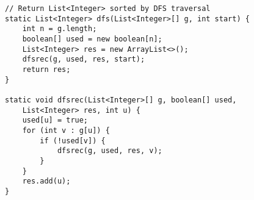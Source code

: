\begin{verbatim}
// Return List<Integer> sorted by DFS traversal
static List<Integer> dfs(List<Integer>[] g, int start) {
	int n = g.length;
	boolean[] used = new boolean[n];
	List<Integer> res = new ArrayList<>();	
	dfsrec(g, used, res, start);
	return res;
}

static void dfsrec(List<Integer>[] g, boolean[] used,
	List<Integer> res, int u) {
	used[u] = true;
	for (int v : g[u]) {
		if (!used[v]) {
			dfsrec(g, used, res, v);
		}
	}
	res.add(u);
}
\end{verbatim}